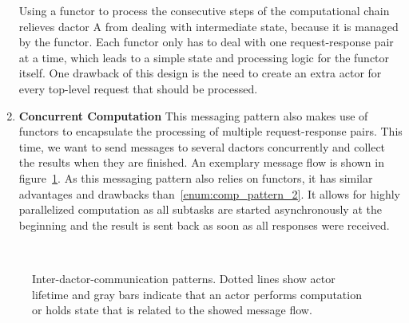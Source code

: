 \begin{enumerate}
        Using a \gls{functor} to process the consecutive steps of the computational chain relieves \gls{dactor} A from dealing with intermediate state, because it is managed by the \gls{functor}.
        Each \gls{functor} only has to deal with one request-response pair at a time, which leads to a simple state and processing logic for the \gls{functor} itself.
        One drawback of this design is the need to create an extra actor for every top-level request that should be processed.

      \item\label{enum:comp_pattern_3} \textbf{Concurrent Computation}
        This messaging pattern also makes use of \glspl{functor} to encapsulate the processing of multiple request-response pairs.
        This time, we want to send messages to several \glspl{dactor} concurrently and collect the results when they are finished.
        An exemplary message flow is shown in figure~\ref{fig:comp_pattern_3}.
        As this messaging pattern also relies on \glspl{functor}, it has similar advantages and drawbacks than~\ref{enum:comp_pattern_2}.
        It allows for highly parallelized computation as all subtasks are started asynchronously at the beginning and the result is sent back as soon as all responses were received.
    \end{enumerate}

    \begin{figure}
      \centering

      \begin{subfigure}[c]{0.49\textwidth}
        
        \label{fig:comp_pattern_1}
        \hfill\\
        
        \label{fig:comp_pattern_3}
      \end{subfigure}
      \begin{subfigure}[c]{0.5\textwidth}
        
        \label{fig:comp_pattern_2}
      \end{subfigure}
      \caption{Inter-\gls{dactor}-communication patterns. Dotted lines show actor lifetime and gray bars indicate that an actor performs computation or holds state that is related to the showed message flow.}
      \label{fig:comp_patterns}
    \end{figure}
  
